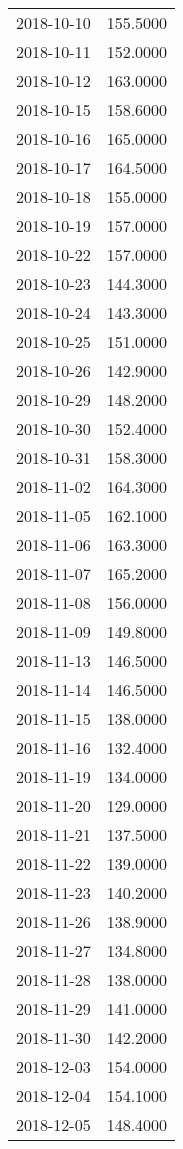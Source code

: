 \begin{tabular}{lr}
2018-10-10 &    155.5000 \\
2018-10-11 &    152.0000 \\
2018-10-12 &    163.0000 \\
2018-10-15 &    158.6000 \\
2018-10-16 &    165.0000 \\
2018-10-17 &    164.5000 \\
2018-10-18 &    155.0000 \\
2018-10-19 &    157.0000 \\
2018-10-22 &    157.0000 \\
2018-10-23 &    144.3000 \\
2018-10-24 &    143.3000 \\
2018-10-25 &    151.0000 \\
2018-10-26 &    142.9000 \\
2018-10-29 &    148.2000 \\
2018-10-30 &    152.4000 \\
2018-10-31 &    158.3000 \\
2018-11-02 &    164.3000 \\
2018-11-05 &    162.1000 \\
2018-11-06 &    163.3000 \\
2018-11-07 &    165.2000 \\
2018-11-08 &    156.0000 \\
2018-11-09 &    149.8000 \\
2018-11-13 &    146.5000 \\
2018-11-14 &    146.5000 \\
2018-11-15 &    138.0000 \\
2018-11-16 &    132.4000 \\
2018-11-19 &    134.0000 \\
2018-11-20 &    129.0000 \\
2018-11-21 &    137.5000 \\
2018-11-22 &    139.0000 \\
2018-11-23 &    140.2000 \\
2018-11-26 &    138.9000 \\
2018-11-27 &    134.8000 \\
2018-11-28 &    138.0000 \\
2018-11-29 &    141.0000 \\
2018-11-30 &    142.2000 \\
2018-12-03 &    154.0000 \\
2018-12-04 &    154.1000 \\
2018-12-05 &    148.4000 \\

\end{tabular}
